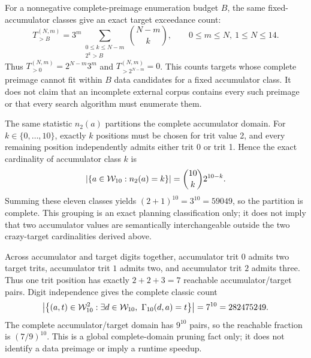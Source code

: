 \documentclass{article}
\begin{document}
For a nonnegative complete-preimage enumeration budget $B$, the same fixed-
accumulator classes give an exact target exceedance count:
\begin{equation}
  T^{(N,m)}_{>B}
    =3^m\!\sum_{\substack{0\leq k\leq N-m\\ 2^k>B}}
      \binom{N-m}{k},
  \qquad 0\leq m\leq N,\ 1\leq N\leq14.
  \label{eq:optimization-crazy-profile-fixed-accumulator-budget-exceedance}
\end{equation}
Thus $T^{(N,m)}_{>0}=2^{N-m}3^m$ and
$T^{(N,m)}_{>2^{N-m}}=0$. This counts targets whose complete preimage cannot
fit within $B$ data candidates for a fixed accumulator class. It does not claim
that an incomplete external corpus contains every such preimage or that every
search algorithm must enumerate them.

The same statistic $n_2(a)$ partitions the complete accumulator domain. For
$k\in\{0,\ldots,10\}$, exactly $k$ positions must be chosen for trit value 2,
and every remaining position independently admits either trit 0 or trit 1.
Hence the exact cardinality of accumulator class $k$ is
\begin{equation}
  \left|\{a\in\mathcal{W}_{10}:n_2(a)=k\}\right|
    = \binom{10}{k}2^{10-k}.
  \label{eq:optimization-crazy-accumulator-class-cardinality}
\end{equation}
Summing these eleven classes yields $(2+1)^{10}=3^{10}=59049$, so the
partition is complete. This grouping is an exact planning classification only;
it does not imply that two accumulator values are semantically interchangeable
outside the two crazy-target cardinalities derived above.

Across accumulator and target digits together, accumulator trit $0$ admits two
target trits, accumulator trit $1$ admits two, and accumulator trit $2$ admits
three. Thus one trit position has exactly $2+2+3=7$ reachable
accumulator/target pairs. Digit independence gives the complete classic count
\begin{equation}
  \left|\left\{(a,t)\in\mathcal{W}_{10}^{2}:
    \exists d\in\mathcal{W}_{10},\ \Gamma_{10}\!\left(d,a\right)=t\right\}\right|
      =7^{10}=282475249.
  \label{eq:optimization-crazy-reachable-pair-count}
\end{equation}
The complete accumulator/target domain has $9^{10}$ pairs, so the reachable
fraction is $(7/9)^{10}$. This is a global complete-domain pruning fact only;
it does not identify a data preimage or imply a runtime speedup.
\end{document}
